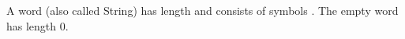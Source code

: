A word \word (also called String) has length \length and consists of symbols \symbol \elem \sigmaS. \newline
The empty word \emptyword has length 0. \newline